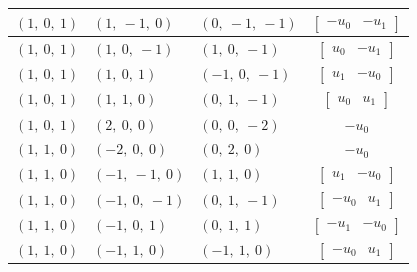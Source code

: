 \documentclass[11pt]{article}
\theoremstyle{definition}
\begin{document}
\begin{longtable}{|l|l|l|c|}
    \hline
    $\left( 1, \  0, \  1\right)$ & $\left( 1, \  -1, \  0\right)$ & $\left( 0, \  -1, \  -1\right)$ & $\left[\begin{matrix}- u_{0} & - u_{1}\end{matrix}\right]$ \\
    \hline
    $\left( 1, \  0, \  1\right)$ & $\left( 1, \  0, \  -1\right)$ & $\left( 1, \  0, \  -1\right)$ & $\left[\begin{matrix}u_{0} & - u_{1}\end{matrix}\right]$ \\
    \hline
    $\left( 1, \  0, \  1\right)$ & $\left( 1, \  0, \  1\right)$ & $\left( -1, \  0, \  -1\right)$ & $\left[\begin{matrix}u_{1} & - u_{0}\end{matrix}\right]$ \\
    \hline
    $\left( 1, \  0, \  1\right)$ & $\left( 1, \  1, \  0\right)$ & $\left( 0, \  1, \  -1\right)$ & $\left[\begin{matrix}u_{0} & u_{1}\end{matrix}\right]$ \\
    \hline
    $\left( 1, \  0, \  1\right)$ & $\left( 2, \  0, \  0\right)$ & $\left( 0, \  0, \  -2\right)$ & $- u_{0}$ \\
    \hline
    $\left( 1, \  1, \  0\right)$ & $\left( -2, \  0, \  0\right)$ & $\left( 0, \  2, \  0\right)$ & $- u_{0}$ \\
    \hline
    $\left( 1, \  1, \  0\right)$ & $\left( -1, \  -1, \  0\right)$ & $\left( 1, \  1, \  0\right)$ & $\left[\begin{matrix}u_{1} & - u_{0}\end{matrix}\right]$ \\
    \hline
    $\left( 1, \  1, \  0\right)$ & $\left( -1, \  0, \  -1\right)$ & $\left( 0, \  1, \  -1\right)$ & $\left[\begin{matrix}- u_{0} & u_{1}\end{matrix}\right]$ \\
    \hline
    $\left( 1, \  1, \  0\right)$ & $\left( -1, \  0, \  1\right)$ & $\left( 0, \  1, \  1\right)$ & $\left[\begin{matrix}- u_{1} & - u_{0}\end{matrix}\right]$ \\
    \hline
    $\left( 1, \  1, \  0\right)$ & $\left( -1, \  1, \  0\right)$ & $\left( -1, \  1, \  0\right)$ & $\left[\begin{matrix}- u_{0} & u_{1}\end{matrix}\right]$ \\

\end{longtable}
\end{document}
